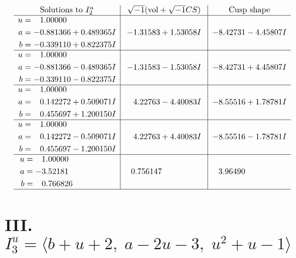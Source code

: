 \documentclass[1p]{elsarticle_modified}
\theoremstyle{definition}
\newcommand{\I}{\sqrt{-1}}
\begin{document}
$$\begin{array}{c|c|c}  
\text{Solutions to }I^u_{2}& \I (\text{vol} + \sqrt{-1}CS) & \text{Cusp shape}\\
 \hline 
\begin{aligned}
u &= \phantom{-}1.00000\phantom{ +0.000000I} \\
a &= -0.881366 + 0.489365 I \\
b &= -0.339110 + 0.822375 I\end{aligned}
 & -1.31583 + 1.53058 I & -8.42731 - 4.45807 I \\ \hline\begin{aligned}
u &= \phantom{-}1.00000\phantom{ +0.000000I} \\
a &= -0.881366 - 0.489365 I \\
b &= -0.339110 - 0.822375 I\end{aligned}
 & -1.31583 - 1.53058 I & -8.42731 + 4.45807 I \\ \hline\begin{aligned}
u &= \phantom{-}1.00000\phantom{ +0.000000I} \\
a &= \phantom{-}0.142272 + 0.509071 I \\
b &= \phantom{-}0.455697 + 1.200150 I\end{aligned}
 & \phantom{-}4.22763 - 4.40083 I & -8.55516 + 1.78781 I \\ \hline\begin{aligned}
u &= \phantom{-}1.00000\phantom{ +0.000000I} \\
a &= \phantom{-}0.142272 - 0.509071 I \\
b &= \phantom{-}0.455697 - 1.200150 I\end{aligned}
 & \phantom{-}4.22763 + 4.40083 I & -8.55516 - 1.78781 I \\ \hline\begin{aligned}
u &= \phantom{-}1.00000\phantom{ +0.000000I} \\
a &= -3.52181\phantom{ +0.000000I} \\
b &= \phantom{-}0.766826\phantom{ +0.000000I}\end{aligned}
 & \phantom{-}0.756147\phantom{ +0.000000I} & \phantom{-}3.96490\phantom{ +0.000000I}\\
 \hline 
 \end{array}$$\newpage\newpage\renewcommand{\arraystretch}{1}
\centering \section*{III. $I^u_{3}= \langle b+u+2,\;a-2 u-3,\;u^2+u-1 \rangle$}
\end{document}
